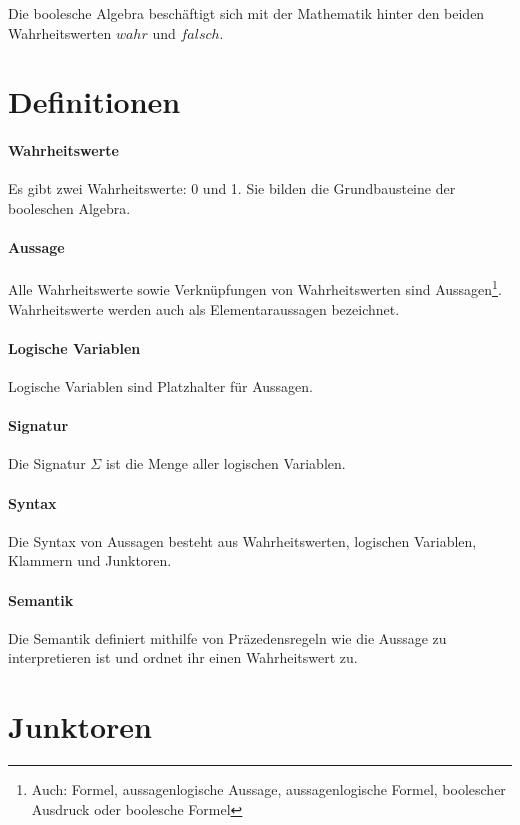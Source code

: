 \documentclass[../main.tex]{subfiles}
\begin{document}
    Die boolesche Algebra beschäftigt sich mit der Mathematik hinter den beiden Wahrheitswerten $wahr$ und $falsch$.
    \clearpage

    \section{Definitionen}
            \paragraph{Wahrheitswerte}
                Es gibt zwei Wahrheitswerte: 0 und 1. Sie bilden die Grundbausteine der booleschen Algebra.
                
            \paragraph{Aussage}
                Alle Wahrheitswerte sowie Verknüpfungen von Wahrheitswerten sind Aussagen\footnote{Auch: Formel, aussagenlogische Aussage, aussagenlogische Formel, boolescher Ausdruck oder boolesche Formel}. Wahrheitswerte werden auch als Elementaraussagen bezeichnet.
                
            \paragraph{Logische Variablen}
                Logische Variablen sind Platzhalter für Aussagen.
                
            \paragraph{Signatur}
                Die Signatur $\Sigma$ ist die Menge aller logischen Variablen.
                
            \paragraph{Syntax}
                Die Syntax von Aussagen besteht aus Wahrheitswerten, logischen Variablen, Klammern und Junktoren.
            \paragraph{Semantik}
                Die Semantik definiert mithilfe von Präzedensregeln wie die Aussage zu interpretieren ist und ordnet ihr einen Wahrheitswert zu.
                
    \section{Junktoren}
    	\label{section:DiskreteMathematik:BoolscheAlgebra:Junktoren}
\end{document}
